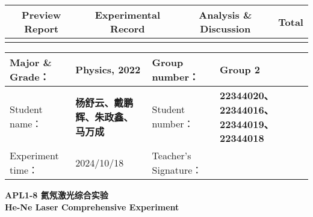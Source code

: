 


\begin{table}
	\renewcommand\arraystretch{1.7}
	\begin{tabularx}{\textwidth}{
			|X|X|X|X
			|X|X|X|X|}
		\hline
		\multicolumn{2}{|c|}{Preview Report}&\multicolumn{2}{|c|}{Experimental Record}&\multicolumn{2}{|c|}{Analysis \& Discussion}&\multicolumn{2}{|c|}{\Large\textbf{Total}}\\
		\hline
		\LARGE & & \LARGE & & \LARGE & & \LARGE & \\
		\hline
	\end{tabularx}
\end{table}


\begin{table}
	\renewcommand\arraystretch{1.7}
	\begin{tabularx}{\textwidth}{|X|X|X|X|}
		\hline
		Major \& Grade： & Physics, 2022 &Group number： & Group 2\\
		\hline
		Student name： & \textbf{杨舒云、戴鹏辉、朱政鑫、马万成}  & Student number： & \textbf{22344020、22344016、22344019、22344018}\\
		\hline
		Experiment time： & 2024/10/18 & Teacher's Signature： & \\
		\hline
	\end{tabularx}
\end{table}


\begin{center}
	\huge \textbf{APL1-8 \quad 氦氖激光综合实验\\He-Ne Laser Comprehensive Experiment}
\end{center}


